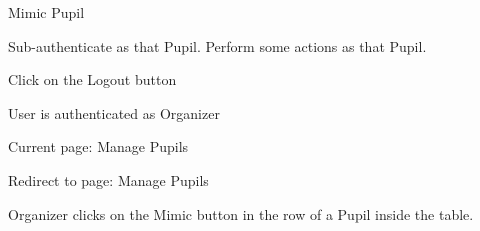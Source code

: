 
\begin{uc}{Mimic Pupil}


    \begin{uc-mss}
    \item Sub-authenticate as that Pupil.  Perform some actions
        as that Pupil.
    \item Click on the Logout button
    \end{uc-mss}

    \begin{uc-pre}
    \item User is authenticated as Organizer
    \item Current page: Manage Pupils
    \end{uc-pre}

    \begin{uc-post}
    \item Redirect to page: Manage Pupils
    \end{uc-post}

    \begin{uc-trig}
        Organizer clicks on the Mimic button in the row of a Pupil inside the
        table.
    \end{uc-trig}

\end{uc}

